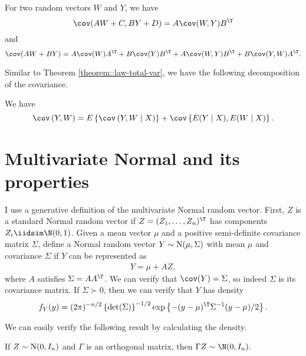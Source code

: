 \begin{proposition}
For two random vectors $W$ and $Y$, we have
\[
\cov(AW+C,BY+D)=A\cov(W,Y)B^{\T}
\]
and 
\[
\cov(AW+BY)=A\cov(W)A^{\T}+B\cov(Y)B^{\T}+A\cov(W,Y)B^{\T}+B\cov(Y,W)A^{\T}.
\]
\end{proposition}


Similar to Theorem \ref{theorem::law-total-var}, we have the following decomposition of the covariance. 

\begin{theorem}
\label{theorem::law-total-cov}
We have 
\[
\cov\left(   Y, W    \right)  =E\left\{  \cov\left( Y ,W\mid X\right) \right\} +\cov\left\{ E(Y\mid X) , E(W\mid X) \right\}. 
\]
\end{theorem}

\section{Multivariate Normal and its properties}

I use a generative definition of the multivariate Normal random vector.
First, $Z$ is a standard Normal random vector if $Z=(Z_{1},\ldots,Z_{n})^{\T}$
has components $Z_{i}\iidsim \N(0,1)$. Given a mean vector $\mu$ and a
positive semi-definite covariance matrix $\Sigma$, define a Normal
random vector $Y\sim\text{N(\ensuremath{\mu,\Sigma})}$ with mean
$\mu$ and covariance $\Sigma$ if $Y$ can be represented as  
\begin{eqnarray}
Y=\mu+AZ, \label{eq::mvn-definitions}
\end{eqnarray}
where $A$ satisfies $\Sigma=AA^{\T}$. We can verify that $\cov(Y)=\Sigma$,
so indeed $\Sigma$ is its covariance matrix. If $\Sigma\succ0$,
then we can verify that $Y$ has density
\begin{equation}\label{equation::normal-density}
f_{Y}(y)=(2\pi)^{-n/2}\left\{ \det(\Sigma)\right\} ^{-1/2}\exp\left\{ -(y-\mu)^{\T}\Sigma^{-1}(y-\mu)/2\right\} .
\end{equation}

We can easily verify the following result by calculating the density.

\begin{proposition}\label{prop::rotation-mvn}
If $Z\sim\textup{N}(0,I_{n})$ and $\Gamma$ is an orthogonal matrix, then
$\Gamma Z\sim \N(0,I_{n}).$
\end{proposition}


